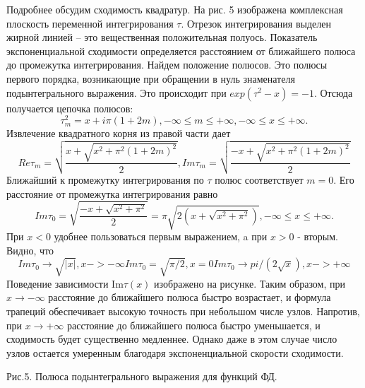 Подробнее обсудим сходимость квадратур. На рис. 5 изображена
комплексная плоскость переменной интегрирования $\tau$. Отрезок
интегрирования выделен жирной линией – это вещественная положительная
полуось. Показатель экспоненциальной сходимости определяется расстоянием
от ближайшего полюса до промежутка интегрирования. Найдем положение полюсов. Это полюсы первого порядка, возникающие при обращении в нуль знаменателя подынтегрального выражения. Это происходит при $exp(\tau^2 -x) = -1$. Отсюда получается цепочка полюсов:
\begin{equation}
\tau_m^2 = x + i\pi(1+2m), -\infty \leqslant m \leqslant +\infty, -\infty \leqslant x \leqslant +\infty.
\end{equation}
Извлечение квадратного корня из правой части дает
\begin{equation}
Re \tau_m = \sqrt{\frac{x+\sqrt{x^2 + \pi^2(1+2m)^2}}{2}},
Im \tau_m = \sqrt{\frac{-x+\sqrt{x^2 + \pi^2(1+2m)^2}}{2}}
\end{equation}
Ближайший к промежутку интегрирования по $\tau$ полюс соответствует $m=0$. Его расстояние от промежутка интегрирования равно
\begin{equation}
Im \tau_0 = \sqrt{\frac{-x+\sqrt{x^2 + \pi^2}}{2}} = \pi \sqrt{2(x+\sqrt{x^2+\pi^2})}, -\infty \leqslant x \leqslant +\infty.
\end{equation}
При $x< 0$ удобнее пользоваться первым выражением, a при $x>0$ - вторым. Видно, что 
\begin{equation}
Im \tau_0 \to \sqrt{|x|}, x->-\infty
Im \tau_0 = \sqrt{\pi / 2}, x=0
Im \tau_0 \to  pi /(2\sqrt{x}), x->+\infty
\end{equation}
Поведение зависимости Im$\tau(x)$ изображено на рисунке. %
Таким образом, при $x \to -\infty$ расстояние до ближайшего полюса быстро возрастает, и формула трапеций обеспечивает высокую точность при небольшом числе узлов. Напротив, при $x \to +\infty$ расстояние до ближайшего полюса быстро уменьшается, и сходимость будет существенно медленнее. Однако даже в этом случае число узлов остается умеренным благодаря экспоненциальной скорости сходимости.


Рис.5. Полюса подынтегрального выражения для функций ФД.

